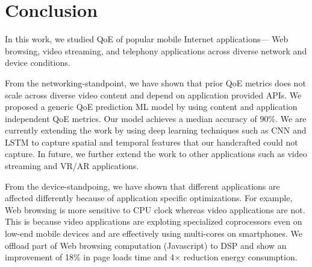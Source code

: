 \section{Conclusion}
In this work, we studied QoE of popular mobile Internet applications--- Web browsing, video streaming, and telephony applications across diverse network and device conditions.

From the networking-standpoint, we have shown that prior QoE metrics does not scale across diverse video content and depend on application provided APIs. 
We proposed a generic QoE prediction ML model by using content and application independent QoE metrics.
Our model achieves a median accuracy of 90\%.
We are currently extending the work by using deep learning techniques such as CNN and LSTM to capture spatial and temporal features that our handcrafted could not capture. 
In future, we further extend the work to other applications such as video streaming and VR/AR applications.

From the device-standpoing, we have shown that different applications are affected differently because of application specific optimizations.
For example, Web browsing is more sensitive to CPU clock whereas video applications are not. 
This is because video applications are exploting specialized coprocessors even on low-end mobile devices and are effectively using multi-cores on smartphones.
We offload part of Web browsing computation (Javascript) to DSP and show an improvement of 18\% in page loads time and 4$\times$ reduction energy consumption.

